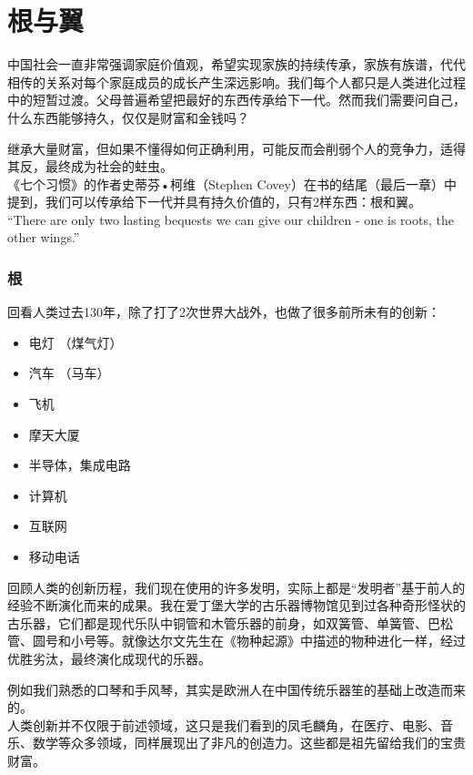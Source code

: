 \chapter{根与翼} %

中国社会一直非常强调家庭价值观，希望实现家族的持续传承，家族有族谱，代代相传的关系对每个家庭成员的成长产生深远影响。我们每个人都只是人类进化过程中的短暂过渡。父母普遍希望把最好的东西传承给下一代。然而我们需要问自己，什么东西能够持久，仅仅是财富和金钱吗？

继承大量财富，但如果不懂得如何正确利用，可能反而会削弱个人的竞争力，适得其反，最终成为社会的蛀虫。\\
《七个习惯》的作者史蒂芬•柯维（Stephen
Covey）在书的结尾（最后一章）中提到，我们可以传承给下一代并具有持久价值的，只有2样东西：根和翼。\\
``There are only two lasting bequests we can give our children - one is
roots, the other wings.''

\hypertarget{ux6839}{%
\subsection{根}\label{ux6839}}

回看人类过去130年，除了打了2次世界大战外，也做了很多前所未有的创新：

\begin{itemize}
\tightlist
\item
  电灯 （煤气灯）
\item
  汽车 （马车）
\item
  飞机
\item
  摩天大厦
\item
  半导体，集成电路
\item
  计算机
\item
  互联网
\item
  移动电话
\end{itemize}

回顾人类的创新历程，我们现在使用的许多发明，实际上都是“发明者”基于前人的经验不断演化而来的成果。我在爱丁堡大学的古乐器博物馆见到过各种奇形怪状的古乐器，它们都是现代乐队中铜管和木管乐器的前身，如双簧管、单簧管、巴松管、圆号和小号等。就像达尔文先生在《物种起源》中描述的物种进化一样，经过优胜劣汰，最终演化成现代的乐器。

例如我们熟悉的口琴和手风琴，其实是欧洲人在中国传统乐器笙的基础上改造而来的。\\
人类创新并不仅限于前述领域，这只是我们看到的凤毛麟角，在医疗、电影、音乐、数学等众多领域，同样展现出了非凡的创造力。这些都是祖先留给我们的宝贵财富。

